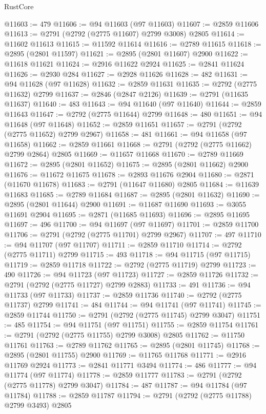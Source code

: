 \begin{lexlean}{RustCore}
\begin{coremodule}
@11603 := 479
@11606 := @94 @11603 (@97 @11603)
@11607 := @2859 @11606
@11613 := @2791 (@2792 (@2775 @11607) @2799 @3008) @2805
@11614 := @11602 @11613
@11615 := @11592 @11614
@11616 := @2789 @11615
@11618 := @2895 (@2801 @11597)
@11621 := @2895 (@2801 @11607) @2900
@11622 := @11618 @11621
@11624 := @2916 @11622 @2924
@11625 := @2841 @11624
@11626 := @2930 @284
@11627 := @2928 @11626
@11628 := 482
@11631 := @94 @11628 (@97 @11628)
@11632 := @2859 @11631
@11635 := @2792 (@2775 @11632) @2799
@11637 := @2846 (@2847 @2126)
@11639 := @2791 (@11635 @11637)
@11640 := 483
@11643 := @94 @11640 (@97 @11640)
@11644 := @2859 @11643
@11647 := @2792 (@2775 @11644) @2799
@11648 := 480
@11651 := @94 @11648 (@97 @11648)
@11652 := @2859 @11651
@11657 := @2791 (@2792 (@2775 @11652) @2799 @2967)
@11658 := 481
@11661 := @94 @11658 (@97 @11658)
@11662 := @2859 @11661
@11668 := @2791 (@2792 (@2775 @11662) @2799 @2864) @2805
@11669 := @11657 @11668
@11670 := @2789 @11669
@11672 := @2895 (@2801 @11652)
@11675 := @2895 (@2801 @11662) @2900
@11676 := @11672 @11675
@11678 := @2893 @11676 @2904
@11680 := @2871 (@11670 @11678)
@11683 := @2791 (@11647 @11680) @2805
@11684 := @11639 @11683
@11685 := @2789 @11684
@11687 := @2895 (@2801 @11632)
@11690 := @2895 (@2801 @11644) @2900
@11691 := @11687 @11690
@11693 := @3055 @11691 @2904
@11695 := @2871 (@11685 @11693)
@11696 := @2895 @11695
@11697 := 496
@11700 := @94 @11697 (@97 @11697)
@11701 := @2859 @11700
@11706 := @2791 (@2792 (@2775 @11701) @2799 @2967)
@11707 := 497
@11710 := @94 @11707 (@97 @11707)
@11711 := @2859 @11710
@11714 := @2792 (@2775 @11711) @2799
@11715 := 493
@11718 := @94 @11715 (@97 @11715)
@11719 := @2859 @11718
@11722 := @2792 (@2775 @11719) @2799
@11723 := 490
@11726 := @94 @11723 (@97 @11723)
@11727 := @2859 @11726
@11732 := @2791 (@2792 (@2775 @11727) @2799 @2883)
@11733 := 491
@11736 := @94 @11733 (@97 @11733)
@11737 := @2859 @11736
@11740 := @2792 (@2775 @11737) @2799
@11741 := 484
@11744 := @94 @11741 (@97 @11741)
@11745 := @2859 @11744
@11750 := @2791 (@2792 (@2775 @11745) @2799 @3047)
@11751 := 485
@11754 := @94 @11751 (@97 @11751)
@11755 := @2859 @11754
@11761 := @2791 (@2792 (@2775 @11755) @2799 @3008) @2805
@11762 := @11750 @11761
@11763 := @2789 @11762
@11765 := @2895 (@2801 @11745)
@11768 := @2895 (@2801 @11755) @2900
@11769 := @11765 @11768
@11771 := @2916 @11769 @2924
@11773 := @2841 @11771 @3494
@11774 := 486
@11777 := @94 @11774 (@97 @11774)
@11778 := @2859 @11777
@11783 := @2791 (@2792 (@2775 @11778) @2799 @3047)
@11784 := 487
@11787 := @94 @11784 (@97 @11784)
@11788 := @2859 @11787
@11794 := @2791 (@2792 (@2775 @11788) @2799 @3493) @2805

\end{coremodule}
\end{lexlean}
